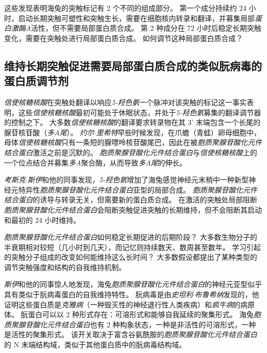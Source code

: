 这些发现表明海兔的突触标记有 2 个不同的组成部分。
第一个成分持续约 24 小时，启动长期突触可塑性和突触生长，需要在细胞核内转录和翻译，并募集局部\textit{蛋白激酶A}活性，但不需要局部蛋白质合成。
第 2 种成分在 72 小时后稳定长期突触变化，需要在突触处进行局部蛋白质合成。
如何调节这种局部蛋白质合成？



\subsection{维持长期突触促进需要局部蛋白质合成的类似朊病毒的蛋白质调节剂}

\textit{信使核糖核酸}在突触处翻译以响应\textit{5-羟色氨}一个脉冲对该突触的标记这一事实表明，这些\textit{信使核糖核酸}最初可能处于休眠状态，并处于\textit{5-羟色氨}募集的翻译调节器的控制之下。
大多数\textit{信使核糖核酸}的翻译要求转录物在其 3' 末端包含一个长尾的腺苷核苷酸（\textit{多A尾}）。
\textit{约尔$\cdot$里希特}早些时候发现，在爪蟾（青蛙）卵母细胞中，母体\textit{信使核糖核酸}只有一条短的腺嘌呤核苷酸尾巴，因此在被\textit{胞质聚腺苷酸化元件结合蛋白}激活之前是沉默的。
\textit{胞质聚腺苷酸化元件结合蛋白}与\textit{信使核糖核酸}上的一个位点结合并募集\textit{多A}聚合酶，从而导致\textit{多A尾}的伸长。


\textit{考斯克$\cdot$斯伊}和他的同事发现，\textit{5-羟色氨}增加了海兔感觉神经元末梢中一种新型神经元特异性\textit{胞质聚腺苷酸化元件结合蛋白}亚型的局部合成。
\textit{胞质聚腺苷酸化元件结合蛋白}的诱导与转录无关，但需要新的蛋白质合成。
在激活的突触处局部阻断\textit{胞质聚腺苷酸化元件结合蛋白}会阻断突触促进突触的长期维持，但不会阻断其启动和最初的 24 小时维持。


\textit{胞质聚腺苷酸化元件结合蛋白}如何稳定长期促进的后期阶段？
大多数生物分子的半衰期相对较短（几小时到几天），而记忆则持续数天、数周甚至数年。
学习引起的突触分子组成的改变如何能维持这么长时间？
大多数假设都提出了某种类型的调节突触强度和结构的自我维持机制。


\textit{斯伊}和他的同事惊人地发现，海兔\textit{胞质聚腺苷酸化元件结合蛋白}的神经元亚型似乎具有类似于朊病毒蛋白的自我维持特性。
朊病毒是由\textit{史坦利$\cdot$布鲁希纳}发现的，他证明这些蛋白质是\textit{克雅病}（一种毁灭性的神经退行性人类疾病）和\textit{疯牛病}的病原体。
朊蛋白可以以 2 种形式存在：可溶形式和能够自我延续的聚集形式。
海兔\textit{胞质聚腺苷酸化元件结合蛋白}也有 2 种构象状态，一种是非活性的可溶形式，一种是活性的聚集形式。
该开关取决于富含谷氨酰胺的\textit{胞质聚腺苷酸化元件结合蛋白}的 N 末端结构域，类似于其他蛋白质中的朊病毒结构域。


